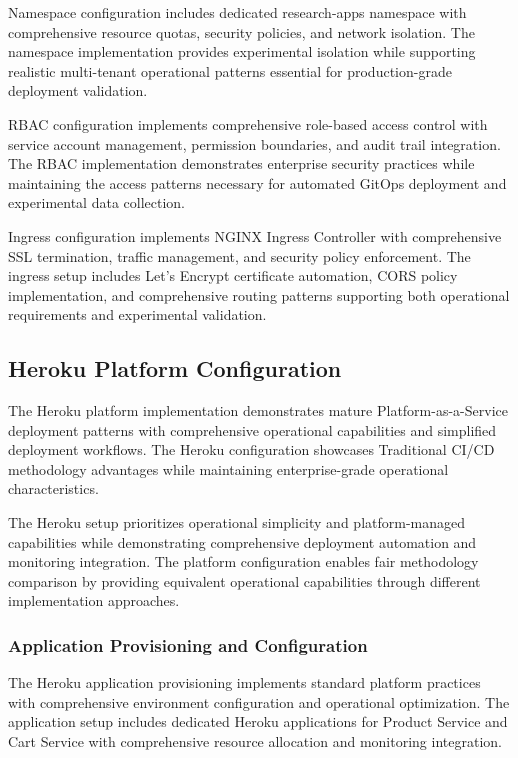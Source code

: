Namespace configuration includes dedicated research-apps namespace with comprehensive resource quotas, security policies, and network isolation. The namespace implementation provides experimental isolation while supporting realistic multi-tenant operational patterns essential for production-grade deployment validation.

RBAC configuration implements comprehensive role-based access control with service account management, permission boundaries, and audit trail integration. The RBAC implementation demonstrates enterprise security practices while maintaining the access patterns necessary for automated GitOps deployment and experimental data collection.

Ingress configuration implements NGINX Ingress Controller with comprehensive SSL termination, traffic management, and security policy enforcement. The ingress setup includes Let's Encrypt certificate automation, CORS policy implementation, and comprehensive routing patterns supporting both operational requirements and experimental validation.

\subsection{Heroku Platform Configuration}

The Heroku platform implementation demonstrates mature Platform-as-a-Service deployment patterns with comprehensive operational capabilities and simplified deployment workflows. The Heroku configuration showcases Traditional CI/CD methodology advantages while maintaining enterprise-grade operational characteristics.

The Heroku setup prioritizes operational simplicity and platform-managed capabilities while demonstrating comprehensive deployment automation and monitoring integration. The platform configuration enables fair methodology comparison by providing equivalent operational capabilities through different implementation approaches.

\subsubsection{Application Provisioning and Configuration}

The Heroku application provisioning implements standard platform practices with comprehensive environment configuration and operational optimization. The application setup includes dedicated Heroku applications for Product Service and Cart Service with comprehensive resource allocation and monitoring integration.

